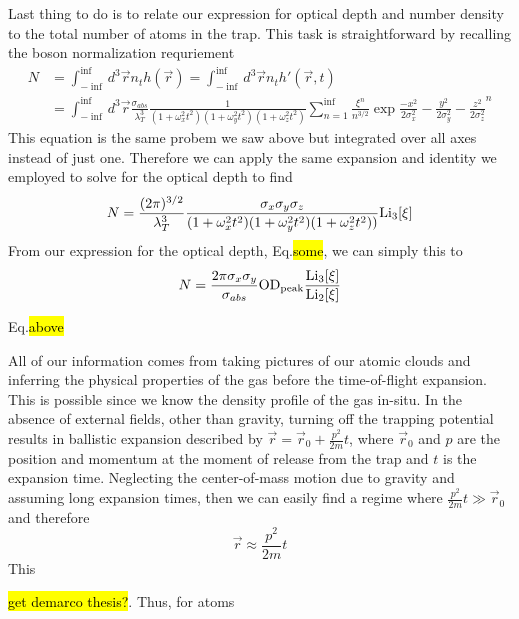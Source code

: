 Last thing to do is to relate our expression for optical depth and number density to the total number of atoms in the trap. This task is straightforward by recalling the boson normalization requriement
\begin{equation}
\begin{split}
N&=\int_{-\inf}^{\inf} d^3\vec{r} n_th(\vec{r}) = \int_{-\inf}^{\inf} d^3\vec{r} n_th'(\vec{r},t) \\
&=\int_{-\inf}^{\inf} d^3\vec{r} \frac{\sigma_{abs}}{\lambda_T^3}\frac{1}{(1+\omega_x^2t^2)(1+\omega_y^2t^2)(1+\omega_z^2t^2)} \sum_{n=1}^{\inf} \frac{\xi^n}{n^{3/2}} \exp{\frac{-x^2}{2\sigma_x^2} - \frac{y^2}{2\sigma_y^2} - \frac{z^2}{2\sigma_z^2}}^n
\end{split}
\end{equation}
This equation is the same probem we saw above but integrated over all axes instead of just one. Therefore we can apply the same expansion and identity we employed to solve for the optical depth to find
\begin{equation}
N=\frac{(2\pi)^{3/2}}{\lambda_T^3} \frac{\sigma_x \sigma_y \sigma_z}{(1+\omega_x^2t^2)(1+\omega_y^2t^2)(1+\omega_z^2t^2))}\text{Li}_{3}\!\left[ \xi \right]
\end{equation}
From our expression for the optical depth, Eq.\hl{some}, we can simply this to
\begin{equation}
N=\frac{2\pi\sigma_x\sigma_y}{\sigma_{abs}}\text{OD}_{\text{peak}}\frac{\text{Li}_{3}\!\left[ \xi \right]}{\text{Li}_{2}\!\left[ \xi \right]}
\end{equation}

Eq.\hl{above} 


All of our information comes from taking pictures of our atomic clouds and inferring the physical properties of the gas before the time-of-flight expansion. This is possible since we know the density profile of the gas in-situ. In the absence of external fields, other than gravity, turning off the trapping potential results in ballistic expansion described by $\vec{r} = \vec{r}_0 + \frac{p^2}{2m}t$, where $\vec{r}_0$ and $p$ are the position and momentum at the moment of release from the trap and $t$ is the expansion time. Neglecting the center-of-mass motion due to gravity and assuming long expansion times, then we can easily find a regime where $\frac{p^2}{2m}t \gg \vec{r}_0$ and therefore
	\begin{equation}
		\vec{r} \approx \frac{p^2}{2m}t
	\end{equation}
This 

 \cite{Ketterle1999} \hl{get demarco thesis?}. Thus, for atoms 

